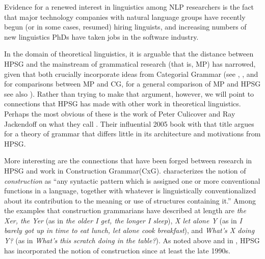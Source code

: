 \documentclass[output=paper,biblatex,babelshorthands,newtxmath,draftmode,colorlinks,citecolor=brown]{langscibook}
\begin{document}
\largerpage
Evidence for a renewed interest in linguistics among NLP researchers is the fact that major technology companies with natural language groups have recently begun (or in some cases, resumed) hiring linguists, and increasing numbers of new linguistics PhDs have taken jobs in the software industry.  

In the domain of theoretical linguistics, it is arguable that the distance between HPSG and the mainstream of grammatical research (that is, MP) has narrowed, given that both crucially incorporate ideas from Categorial Grammar (see \citealt{RetStab2004}, \citealt{BE95a}, and \citealt{MuellerUnifying} for comparisons between MP and CG, for a general comparison of MP and HPSG see also ). Rather than trying to make that argument, however, we will point to connections that HPSG has made with other work in theoretical linguistics.  Perhaps the most obvious of these is the work of Peter Culicover and Ray Jackendoff on what they call {\em{}}.  Their influential 2005 book with that title \citep{CJ2005a} argues for a theory of grammar that differs little in its architecture and motivations from HPSG. 

More interesting are the connections that have been forged between research in HPSG and work in Construction Grammar\indexcxg (CxG).  \citet[]{Fillmore88a} characterizes the notion  of \emph{construction} as ``any syntactic pattern which is assigned one or more conventional functions in a language, together with whatever is linguistically conventionalized about its contribution to the meaning or use of structures containing it.''  Among the examples that construction grammarians have described at length are \emph{the Xer, the Yer} (as in \emph{the older I get, the longer I sleep}), \emph{X let alone Y} (as in \emph{I barely got up in time to eat lunch, let alone cook breakfast}), and \emph{What's X doing Y?} (as in \emph{What's this scratch doing in the table?}).  As noted above and in \crossrefchaptert[\page \pageref{page-HPSG-always-was-constructional}, \pageref{cxg:page-HPSG-inheritance}]{cxg}, HPSG has incorporated the notion of construction since at least the late 1990s.  
\end{document}

